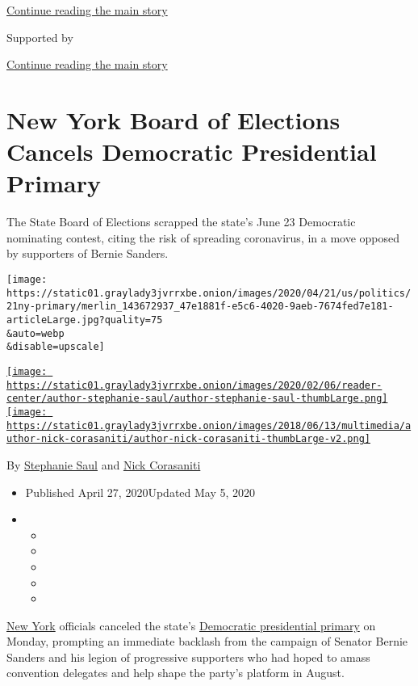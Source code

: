\protect\hyperlink{after-top}{Continue reading the main story}

Supported by

\protect\hyperlink{after-sponsor}{Continue reading the main story}

\hypertarget{new-york-board-of-elections-cancels-democratic-presidential-primary}{%
\section{New York Board of Elections Cancels Democratic Presidential
Primary}\label{new-york-board-of-elections-cancels-democratic-presidential-primary}}

The State Board of Elections scrapped the state's June 23 Democratic
nominating contest, citing the risk of spreading coronavirus, in a move
opposed by supporters of Bernie Sanders.

\texttt{[image: https://static01.graylady3jvrrxbe.onion/images/2020/04/21/us/politics/21ny-primary/merlin\_143672937\_47e1881f-e5c6-4020-9aeb-7674fed7e181-articleLarge.jpg?quality=75\\\&auto=webp\\\&disable=upscale]}

\href{https://www.nytimes3xbfgragh.onion/by/stephanie-saul}{\texttt{[image: https://static01.graylady3jvrrxbe.onion/images/2020/02/06/reader-center/author-stephanie-saul/author-stephanie-saul-thumbLarge.png]}}\href{https://www.nytimes3xbfgragh.onion/by/nick-corasaniti}{\texttt{[image: https://static01.graylady3jvrrxbe.onion/images/2018/06/13/multimedia/author-nick-corasaniti/author-nick-corasaniti-thumbLarge-v2.png]}}

By \href{https://www.nytimes3xbfgragh.onion/by/stephanie-saul}{Stephanie
Saul} and
\href{https://www.nytimes3xbfgragh.onion/by/nick-corasaniti}{Nick
Corasaniti}

\begin{itemize}
\item
  Published April 27, 2020Updated May 5, 2020
\item
  \begin{itemize}
  \item
  \item
  \item
  \item
  \item
  \end{itemize}
\end{itemize}

\href{https://www.nytimes3xbfgragh.onion/2020/05/05/us/politics/ny-presidential-primary.html}{New
York} officials canceled the state's
\href{https://www.nytimes3xbfgragh.onion/2020/06/22/nyregion/ny-primary-2020.html}{Democratic
presidential primary} on Monday, prompting an immediate backlash from
the campaign of Senator Bernie Sanders and his legion of progressive
supporters who had hoped to amass convention delegates and help shape
the party's platform in August.

